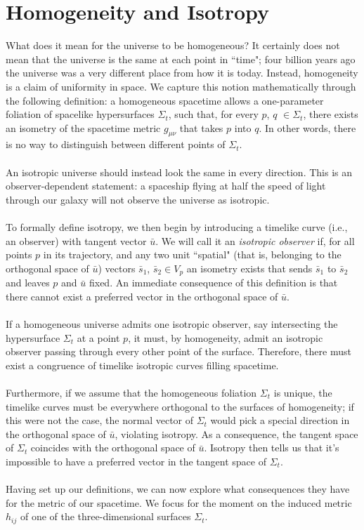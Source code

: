 \documentclass[12pt,letterpaper]{article}         %
\newcommand\para{\paragraph{}}
\begin{document}
\section{Homogeneity and Isotropy}
What does it mean for the universe to be homogeneous? It certainly does not mean that the universe is the same at each point in “time"; four billion years ago the universe was a very different place from how it is today. Instead, homogeneity is a claim of uniformity in space. We capture this notion mathematically through the following definition: a homogeneous spacetime allows a one-parameter foliation of spacelike hypersurfaces $\Sigma_t$, such that, for every $p$, $q$ $\in \Sigma_t$, there exists an isometry of the spacetime metric $g_{\mu \nu}$ that takes $p$ into $q$. In other words, there is no way to distinguish between different points of $\Sigma_t$.
\para
An isotropic universe should instead look the same in every direction. This is an observer-dependent statement: a spaceship flying at half the speed of light through our galaxy will not observe the universe as isotropic.
\para
To formally define isotropy, we then begin by introducing a timelike curve (i.e., an observer) with tangent vector $\bar{u}$. We will call it an \emph{isotropic observer} if, for all points $p$ in its trajectory, and any two unit “spatial" (that is, belonging to the orthogonal space of $\bar{u}$) vectors $\bar{s}_1$, $\bar{s}_2 \in V_p$ an isometry exists that sends $\bar{s}_1$ to $\bar{s}_2$ and leaves $p$ and $\bar{u}$ fixed. An immediate consequence of this definition is that there cannot exist a preferred vector in the orthogonal space of $\bar{u}$.
\para
If a homogeneous universe admits one isotropic observer, say intersecting the hypersurface $\Sigma_t$ at a point $p$, it must, by homogeneity, admit an isotropic observer passing through every other point of the surface. Therefore, there must exist a congruence of timelike isotropic curves filling spacetime. 
\para
Furthermore, if we assume that the homogeneous foliation $\Sigma_t$ is unique, the timelike curves must be everywhere orthogonal to the surfaces of homogeneity; if this were not the case, the normal vector of $\Sigma_t$ would pick a special direction in the orthogonal space of $\bar{u}$, violating isotropy. As a consequence, the tangent space of $\Sigma_t$ coincides with the orthogonal space of $\bar{u}$. Isotropy then tells us that it's impossible to have a preferred vector in the tangent space of $\Sigma_t$.
\para
Having set up our definitions, we can now explore what consequences they have for the metric of our spacetime. We focus for the moment on the induced metric $h_{i j}$ of one of the three-dimensional surfaces $\Sigma_t$.
\end{document}
